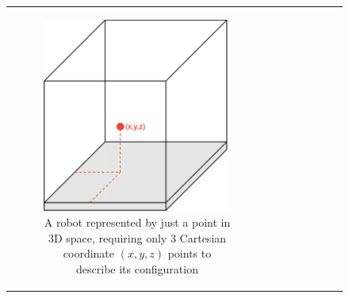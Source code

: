 \begin{figure}[H]
\begin{center}
\begin{tabular}{cc}

    \begin{subfigure}{0.4\textwidth}
    \begin{center}
    \includegraphics[width=\linewidth]{chapters/chapter2/img/motionPlanning/3DPointConfiguration.png}
    \caption{A robot represented by just a point in 3D space, requiring only 3 Cartesian coordinate $(x,y,z)$ points to describe its \gls{configuration}}
    \label{subfig:3DPointConfig}
    \end{center}
    \end{subfigure}
    &
    \begin{subfigure}{0.4\textwidth}
    \begin{center}

\end{center}
\end{subfigure}
\end{tabular}
\end{center}
\end{figure}
